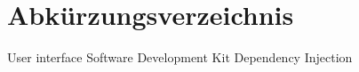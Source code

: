 
\chapter*{Abkürzungsverzeichnis}

\begin{acronym}
  {User interface}
  {Software Development Kit}
  {Dependency Injection}
\end{acronym}
